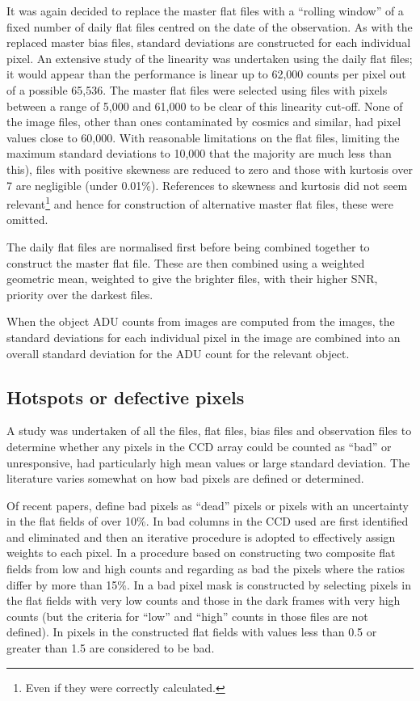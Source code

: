 It was again decided to replace the master flat files with a ``rolling window''
of a fixed number of daily flat files centred on the date of the observation.
As with the replaced master bias files, standard deviations are constructed for
each individual pixel. An extensive study of the linearity was undertaken using
the daily flat files; it would  appear than the performance is linear up to
62,000 counts per pixel out of a possible 65,536. The master flat files were
selected using files with pixels between a range of 5,000 and 61,000 to be clear
of this linearity cut-off. None of the image files, other than ones contaminated
by cosmics and similar, had pixel values close to 60,000. With reasonable limitations on the flat files,
limiting the maximum standard deviations to 10,000 that the
majority are much less than this), files with positive skewness are reduced to
zero and those with kurtosis over 7 are negligible (under 0.01\%). References to
skewness and kurtosis did not seem relevant\footnote{Even if they were correctly calculated.} and hence for
construction of alternative master flat files, these were omitted.

The daily flat files are normalised first before being combined together to
construct the master flat file. These are then combined using a weighted
geometric mean, weighted to give the brighter files, with their higher SNR,
priority over the darkest files.

When the object ADU counts from {\rem} images are computed from the images, the
standard deviations for each individual pixel in the image are combined into an
overall standard deviation for the ADU count for the relevant object.

\subsection{Hotspots or defective pixels}
\protect\label{section:hotspots}

A study was undertaken of all the files, flat files, bias files and observation
files to determine whether any pixels in the CCD array could be counted as
``bad'' or unresponsive, had particularly high mean values or large standard
deviation. The literature varies somewhat on how bad pixels are defined or
determined.

Of recent papers, \citet{allers20} define bad pixels as ``dead'' pixels or pixels
with an uncertainty in the flat fields of over 10\%. In \citet{piskunov20} bad
columns in the CCD used are first identified and eliminated and then an
iterative procedure is adopted to effectively assign weights to each pixel. In
\citet{bongiovanni19} a procedure based on constructing two composite flat
fields from low and high counts and regarding as bad the pixels where the ratios
differ by more than 15\%. In \citet{belli18} a bad pixel mask is constructed by
selecting pixels in the flat fields with very low counts and those in the dark
frames with very high counts (but the criteria for ``low'' and ``high'' counts
in those files are not defined). In \citet{briesemeister18} pixels in the
constructed flat fields with values less than 0.5 or greater than 1.5 are
considered to be bad.

